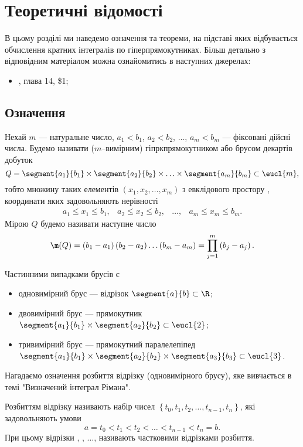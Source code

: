 \chapter{Теоретичні відомості}
В цьому розділі ми наведемо означення та теореми, на підставі яких відбувається обчислення кратних інтегралів по гіперпрямокутниках. Більш детально з відповідним матеріалом можна ознайомитись в наступних джерелах:
\begin{itemize}
\item \cite{Dor94v2}, глава 14, \$1;
\end{itemize}
\section{Означення}
\begin{definition}[Гіперпрямокутник]\label{def:box}
Нехай $m$ --- натуральне число, ${a_1<b_1}$, ${a_2 < b_2}$, $\ldots$, ${a_m < b_m}$ --- фіксовані дійсні числа. Будемо називати ($m$--вимірним) гіпркпрямокутником або брусом декартів добуток
\[
Q = \segment{a_1}{b_1}\times\segment{a_2}{b_2}\times\ldots\times\segment{a_m}{b_m} \subset \eucl{m},
\]
тобто множину таких елементів ${\left(x_1, x_2, \ldots, x_m\right)}$ з евклідового простору , координати яких задовольняють нерівності
\[
\begin{array}{cccc}
a_1\leq x_1\leq b_1,&
a_2\leq x_2\leq b_2,&
\ldots,&
a_m\leq x_m\leq b_m.
\end{array}
\]
Мірою $Q$ будемо називати наступне число
\[
\m(Q) = \left(b_1-a_1\right)\left(b_2 - a_2\right)\ldots\left(b_m-a_m\right) = \prod\limits_{j=1}^{m}\left(b_j - a_j\right).
\]
\end{definition}
\begin{example}
Частинними випадками брусів є
\begin{itemize}
\item одновимірний брус --- відрізок ${\segment{a}{b}\subset\R}$;
\item двовимірний брус --- прямокутник ${\segment{a_1}{b_1}\times\segment{a_2}{b_2}\subset\eucl{2}}$;
\item тривимірний брус --- прямокутний паралелепіпед  ${\segment{a_1}{b_1}\times\segment{a_2}{b_2}\times\segment{a_3}{b_3}\subset\eucl{3}}$.
\end{itemize}
\end{example}
Нагадаємо означення розбиття відрізку (одновимірного брусу), яке вивчається в темі "Визначений інтеграл Рімана".
\begin{definition}
Розбиттям відрізку  називають набір чисел ${\left\{t_0, t_1, t_2, \ldots, t_{n-1}, t_{n}\right\}}$, які задовольняють умови
\[
a = t_0 < t_1 < t_2 < \ldots  < t_{n-1} < t_{n} = b.
\]
При цьому відрізки , , ${\ldots}$,  називають частковими відрізками розбиття.

\end{definition}

